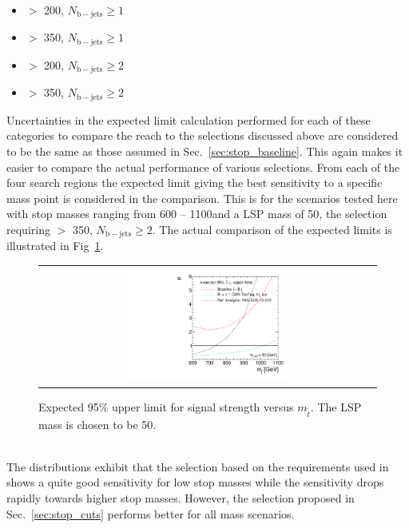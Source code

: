 \begin{itemize}
 \item \met $>$ 200\gev, $N_\mathrm{b-jets} \ge 1$ 
 \item \met $>$ 350\gev, $N_\mathrm{b-jets} \ge 1$ 
 \item \met $>$ 200\gev, $N_\mathrm{b-jets} \ge 2$ 
 \item \met $>$ 350\gev, $N_\mathrm{b-jets} \ge 2$ 
\end{itemize}   
Uncertainties in the expected limit calculation performed for each of these categories to compare the reach to the selections discussed above are considered to be the same as those assumed in Sec.~\ref{sec:stop_baseline}. This again makes it easier to compare the actual performance of various selections. From each of the four search regions the expected limit giving the best sensitivity to a specific mass point is considered in the comparison. This is for the scenarios tested here with stop masses ranging from 600 -- 1100\gev and a LSP mass of 50\gev, the selection requiring \met $>$ 350\gev, $N_\mathrm{b-jets} \ge 2$. The actual comparison of the expected limits is illustrated in Fig~\ref{fig:stop_baselinetoptagref_limit}. 
\begin{figure}[!h]
  \centering
  \begin{tabular}{c}
                \includegraphics[width=0.49\textwidth]{figures/limitplot4BinSel_BaselineTopTagTransverseMassRef.pdf} 
  \end{tabular}
  \caption{Expected 95\% upper limit for signal strength versus $m_{\tilde{t}}$. The LSP mass is chosen to be 50\gev.}
  \label{fig:stop_baselinetoptagref_limit}
\end{figure}
\\
The distributions exhibit that the selection based on the requirements used in~\cite{CMS-PAS-SUS-13-015} shows a quite good sensitivity for low stop masses while the sensitivity drops rapidly towards higher stop masses. However, the selection proposed in Sec.~\ref{sec:stop_cuts} performs better for all mass scenarios.  

